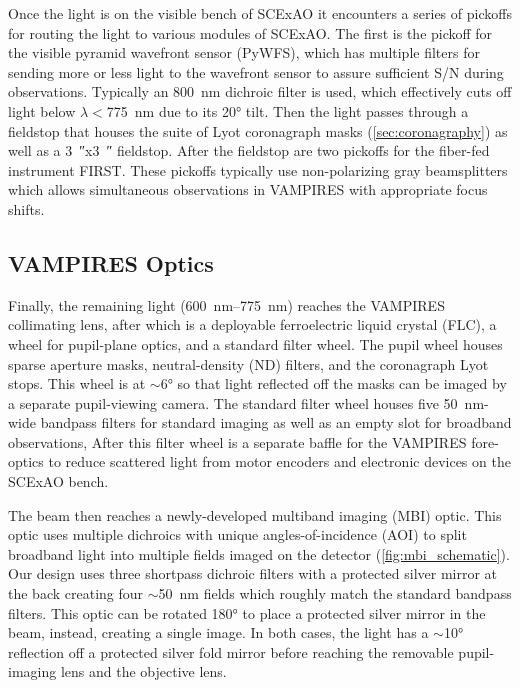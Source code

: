 Once the light is on the visible bench of SCExAO it encounters a series of pickoffs for routing the light to various modules of SCExAO. The first is the pickoff for the visible pyramid wavefront sensor (PyWFS), which has multiple filters for sending more or less light to the wavefront sensor to assure sufficient S/N during observations. Typically an \SI{800}{\nano\meter} dichroic filter is used, which effectively cuts off light below $\lambda <$\SI{775}{\nano\meter} due to its \ang{20} tilt. Then the light passes through a fieldstop that houses the suite of Lyot coronagraph masks (\autoref{sec:coronagraphy}) as well as a \SI{3}{\arcsecond}x\SI{3}{\arcsecond} fieldstop. After the fieldstop are two pickoffs for the fiber-fed instrument FIRST. These pickoffs typically use non-polarizing gray beamsplitters which allows simultaneous observations in VAMPIRES with appropriate focus shifts.

\subsection{VAMPIRES Optics}
Finally, the remaining light (\SIrange{600}{775}{\nano\meter}) reaches the VAMPIRES collimating lens, after which is a deployable ferroelectric liquid crystal (FLC), a wheel for pupil-plane optics, and a standard filter wheel. The pupil wheel houses sparse aperture masks, neutral-density (ND) filters, and the coronagraph Lyot stops. This wheel is at $\sim$\ang{6} so that light reflected off the masks can be imaged by a separate pupil-viewing camera. The standard filter wheel houses five \SI{50}{\nano\meter}-wide bandpass filters for standard imaging as well as an empty slot for broadband observations, After this filter wheel is a separate baffle for the VAMPIRES fore-optics to reduce scattered light from motor encoders and electronic devices on the SCExAO bench. 

The beam then reaches a newly-developed multiband imaging (MBI) optic. This optic uses multiple dichroics with unique angles-of-incidence (AOI) to split broadband light into multiple fields imaged on the detector (\autoref{fig:mbi_schematic}). Our design uses three shortpass dichroic filters with a protected silver mirror at the back creating four $\sim$\SI{50}{\nano\meter} fields which roughly match the standard bandpass filters. This optic can be rotated \ang{180} to place a protected silver mirror in the beam, instead, creating a single image. In both cases, the light has a $\sim$\ang{10} reflection off a protected silver fold mirror before reaching the removable pupil-imaging lens and the objective lens.

